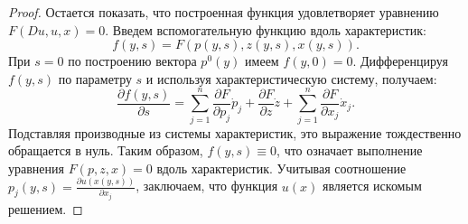 \begin{proof}
    Остается показать, что построенная функция удовлетворяет уравнению
    $F(Du, u, x) = 0$. Введем вспомогательную функцию вдоль характеристик:
    \begin{equation}
        f(y, s) = F(p(y, s), z(y, s), x(y, s)).
    \end{equation}
    При $s = 0$ по построению вектора $p^0(y)$ имеем $f(y, 0) = 0$.
    Дифференцируя $f(y, s)$ по параметру $s$ и используя характеристическую систему, получаем:
    \begin{equation}
        \frac{\partial f(y, s)}{\partial s} = \sum_{j=1}^n \frac{\partial F}{\partial p_j} \dot{p}_j + \frac{\partial F}{\partial z} \dot{z} + \sum_{j=1}^n \frac{\partial F}{\partial x_j} \dot{x}_j.
    \end{equation}
    Подставляя производные из системы характеристик, это выражение тождественно 
    обращается в нуль. Таким образом, $f(y, s) \equiv 0$, что означает выполнение 
    уравнения $F(p, z, x) = 0$ вдоль характеристик. Учитывая соотношение 
    $p_j(y, s) = \frac{\partial u(x(y,s))}{\partial x_j}$, заключаем, что функция $u(x)$ является искомым решением.
\end{proof}
